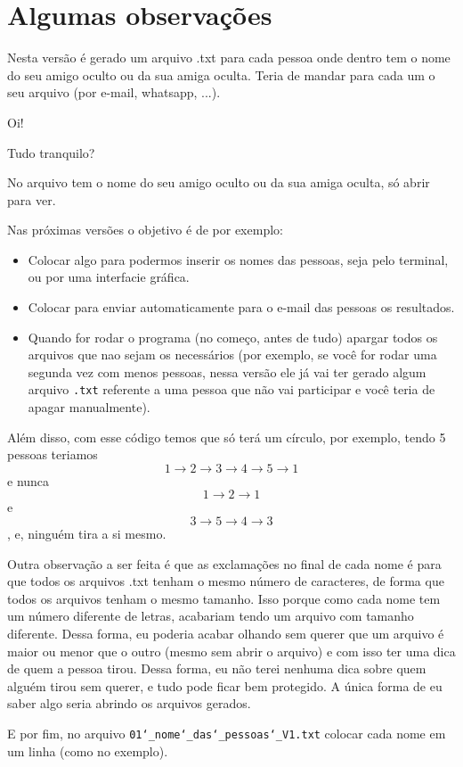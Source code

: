 
\section{Algumas observações}

Nesta versão é gerado um arquivo .txt para cada pessoa onde dentro tem o nome do seu amigo oculto ou da sua amiga oculta.
Teria de mandar para cada um o seu arquivo (por e-mail, whatsapp, ...).

\begin{tcolorbox}[
                 colback=white,
                 colframe=black,
                 sharp corners,
                 boxrule=2pt,
                 colbacktitle=white,
                 coltitle = black,
                 title=Exemplo de mensagem.]
Oi!

Tudo tranquilo?

No arquivo tem o nome do seu amigo oculto ou da sua amiga oculta, só abrir para ver.
\end{tcolorbox}

Nas próximas versões o objetivo é de por exemplo:
\begin{itemize}

\item Colocar algo para podermos inserir os nomes das pessoas, seja pelo terminal, ou por uma interfacie gráfica.

\item Colocar para enviar automaticamente para o e-mail das pessoas os resultados.

\item Quando for rodar o programa (no começo, antes de tudo) apargar todos os arquivos que nao sejam os necessários (por exemplo, se você for rodar uma segunda vez com menos pessoas, nessa versão ele já vai ter gerado algum arquivo \texttt{.txt} referente a uma pessoa que não vai participar e você teria de apagar manualmente).

\end{itemize}

Além disso, com esse código temos que só terá um círculo, por exemplo, tendo 5 pessoas teriamos $$1 \rightarrow 2 \rightarrow 3 \rightarrow 4 \rightarrow 5 \rightarrow 1$$ e nunca $$1 \rightarrow 2 \rightarrow 1$$ e $$3 \rightarrow 5 \rightarrow 4 \rightarrow 3$$, e, ninguém tira a si mesmo.

Outra observação a ser feita é que as exclamações no final de cada nome é para que todos os arquivos .txt tenham o mesmo número de caracteres,
de forma que todos os arquivos tenham o mesmo tamanho.
Isso porque como cada nome tem um número diferente de letras, acabariam tendo um arquivo com tamanho diferente.
Dessa forma, eu poderia acabar olhando sem querer que um arquivo é maior ou menor que o outro (mesmo sem abrir o arquivo)
e com isso ter uma dica de quem a pessoa tirou.
Dessa forma, eu não terei nenhuma dica sobre quem alguém tirou sem querer, e tudo pode ficar bem protegido.
A única forma de eu saber algo seria abrindo os arquivos gerados.

E por fim, no arquivo \texttt{01\char`_nome\char`_das\char`_pessoas\char`_V1.txt} colocar cada nome em um linha (como no exemplo).



















